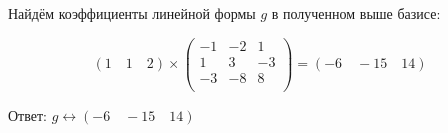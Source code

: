 \documentclass{article}
\begin{document}
\begin{center}
Найдём коэффициенты линейной формы $g$ в полученном выше базисе:
\end{center}
$$\left(1\quad1\quad2\right) \times
\left(\begin{array}{rrr}
-1 & -2 & 1 \\
1 & 3 & -3 \\
-3 & -8 & 8 \\
\end{array}\right) = \left(-6\quad -15 \quad 14\right)$$


\begin{flushright}
Ответ: $g \leftrightarrow \left(-6\quad -15 \quad 14\right)$
\end{flushright}
\end{document}
